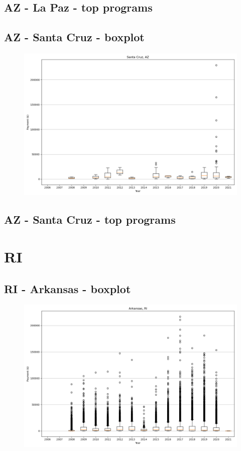 \subsection*{AZ - La Paz - top programs}

\newpage
\subsection*{AZ - Santa Cruz - boxplot}
\begin{figure}[h]
\centering
\includegraphics[width=7in]{../output/boxplots/counties/Santa Cruz-AZ_boxplot.png}
\end{figure}


\subsection*{AZ - Santa Cruz - top programs}

\newpage
\section*{RI}
\subsection*{RI - Arkansas - boxplot}
\begin{figure}[h]
\centering
\includegraphics[width=7in]{../output/boxplots/counties/Arkansas-RI_boxplot.png}
\end{figure}


